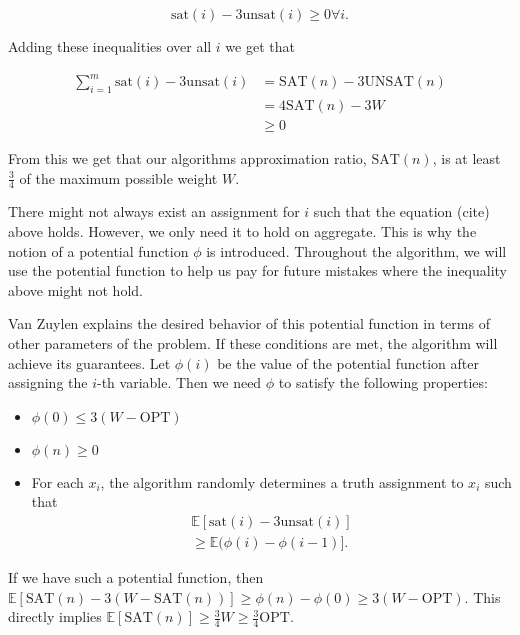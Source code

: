 \documentclass[11pt,letter]{article}
\numberwithin{theorem}{section}
\begin{document}
\begin{equation}
\label{eq:1}
\mathrm{sat}(i) - 3\mathrm{unsat}(i) \geq 0 \forall i.
\end{equation}

Adding these inequalities over all $i$ we get that

\begin{equation*}
\begin{aligned}
\sum_{i = 1}^{m} \mathrm{sat}(i) - 3\mathrm{unsat}(i) & = \mathrm{SAT}(n) - 3\mathrm{UNSAT}(n) \\
& = 4\mathrm{SAT}(n) - 3W \\
& \geq 0
\end{aligned}
\end{equation*}

From this we get that our algorithms approximation ratio, $\textrm{SAT}(n)$, is at least $\frac{3}{4}$ of the maximum possible weight $W$.

There might not always exist an assignment for $i$ such that the equation (cite) above holds. However, we only need it to hold on aggregate.
This is why the notion of a potential function $\phi$ is introduced. Throughout the algorithm, we will use the potential function to help us pay
for future mistakes where the inequality above might not hold.

Van Zuylen explains the desired behavior of this potential function in terms of other parameters of the problem. If these conditions are met, the algorithm
will achieve its guarantees. Let $\phi(i)$ be the value of the potential function after assigning the $i$-th variable. Then we need $\phi$ to satisfy the following properties:

\begin{itemize}
	\item $\phi(0) \leq 3(W-\textrm{OPT})$
	\item $\phi(n) \geq 0$
	\item For each $x_i$, the algorithm randomly determines a truth assignment to $x_i$ such that
\begin{equation}
\begin{aligned}
\label{eq:2}
\mathbb{E}[\mathrm{sat}(i) - 3\mathrm{unsat}(i)] \\
\geq \mathbb{E}(\phi(i) - \phi(i-1)].
\end{aligned}
\end{equation}
\end{itemize}

If we have such a potential function, then $\mathbb{E}[\textrm{SAT}(n)- 3\left(W-\textrm{SAT}(n)\right)] \geq \phi(n) - \phi(0) \geq 3(W-\textrm{OPT})$.
This directly implies $\mathbb{E}[\textrm{SAT}(n)] \geq \frac{3}{4} W \geq \frac{3}{4} \textrm{OPT}$.
\end{document}
